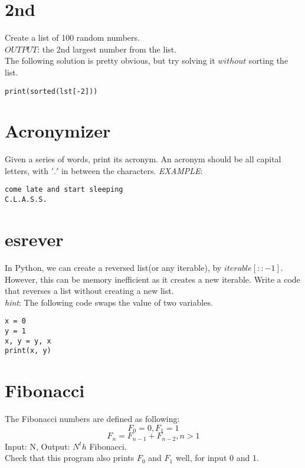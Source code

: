 \documentclass{article}
\begin{document}
\section{2nd}
Create a list of 100 random numbers.\\
$OUTPUT$: the 2nd largest number from the list.\\
The following solution is pretty obvious, but try solving it $without$ sorting the list.
\begin{lstlisting}
print(sorted(lst[-2]))
\end{lstlisting}

\section{Acronymizer}
Given a series of words, print its acronym. An acronym should be all capital
letters, with $'.'$ in between the characters.
\textit{EXAMPLE}:
\begin{lstlisting}
come late and start sleeping
C.L.A.S.S.
\end{lstlisting}

\section{esrever}
In Python, we can create a reversed list(or any iterable), by
$iterable[::-1]$. However, this can be memory inefficient as it creates a new
iterable. Write a code that reverses a list without creating a new list.\\
\textit{hint}: The following code swaps the value of two variables.
\begin{lstlisting}
x = 0
y = 1
x, y = y, x
print(x, y)
\end{lstlisting}

\section{Fibonacci}
The Fibonacci numbers are defined as following:
$$F_0 = 0, F_1 = 1$$
$$F_n = F_{n-1}+F_{n-2}, n > 1$$
Input: N, Output: $N^th$ Fibonacci.\\
Check that this program also prints $F_0$ and $F_1$ well, for input 0 and 1.\\
\end{document}
